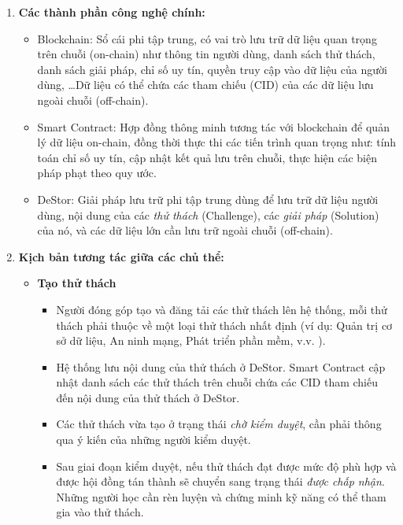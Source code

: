 \documentclass{article}[14pt]
\begin{document}
{  \begin{enumerate}[label=\textbf{\alph*.}]
      \item \textbf{Các thành phần công nghệ chính:}
            \begin{itemize}
                \item Blockchain: Sổ cái phi tập trung, có vai trò lưu trữ dữ liệu quan trọng trên chuỗi (on-chain) như thông tin người dùng, danh sách thử thách, danh sách giải pháp, chỉ số uy tín, quyền truy cập vào dữ liệu của người dùng, \dots Dữ liệu có thể chứa các tham chiếu (CID) của các dữ liệu lưu ngoài chuỗi (off-chain).
                \item Smart Contract: Hợp đồng thông minh tương tác với blockchain để quản lý dữ liệu on-chain, đồng thời thực thi các tiến trình quan trọng như: tính toán chỉ số uy tín, cập nhật kết quả lưu trên chuỗi, thực hiện các biện pháp phạt theo quy ước.
                \item DeStor: Giải pháp lưu trữ phi tập trung dùng để lưu trữ dữ liệu người dùng, nội dung của các \textit{thử thách} (Challenge), các \textit{giải pháp} (Solution) của nó, và các dữ liệu lớn cần lưu trữ ngoài chuỗi (off-chain).
            \end{itemize}

      \item \textbf{Kịch bản tương tác giữa các chủ thể:}
            \begin{itemize}
                \item \textbf{Tạo thử thách}
                      \begin{itemize}
                          \item Người đóng góp tạo và đăng tải các thử thách lên hệ thống, mỗi thử thách phải thuộc về một loại thử thách nhất định (ví dụ: Quản trị cơ sở dữ liệu, An ninh mạng, Phát triển phần mềm, v.v. ).
                          \item Hệ thống lưu nội dung của thử thách ở DeStor. Smart Contract cập nhật danh sách các thử thách trên chuỗi chứa các CID tham chiếu đến nội dung của thử thách ở DeStor.
                          \item Các thử thách vừa tạo ở trạng thái \textit{chờ kiểm duyệt}, cần phải thông qua ý kiến của những người kiểm duyệt.
                          \item Sau giai đoạn kiểm duyệt, nếu thử thách đạt được mức độ phù hợp và được hội đồng tán thành sẽ chuyển sang trạng thái \textit{được chấp nhận}. Những người học cần rèn luyện và chứng minh kỹ năng có thể tham gia vào thử thách.
                      \end{itemize}


\end{itemize}
\end{enumerate}}
\end{document}
